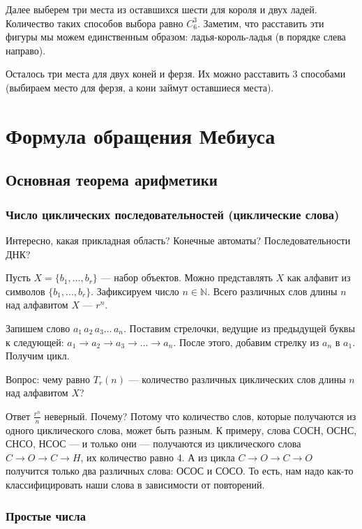 \documentclass[paper=a4, fontsize=11pt]{scrartcl}
\begin{document}
Далее выберем три места из оставшихся шести для короля и двух ладей. Количество таких способов выбора равно $C_6^3$. Заметим, что расставить эти фигуры мы можем единственным образом: ладья-король-ладья (в порядке слева направо).

Осталось три места для двух коней и ферзя. Их можно расставить 3 способами (выбираем место для ферзя, а кони займут оставшиеся места).

\section{Формула обращения Мебиуса}
\subsection{Основная теорема арифметики}
\subsubsection{Число циклических последовательностей (циклические слова)}

Интересно, какая прикладная область? Конечные автоматы? Последовательности ДНК?

Пусть $X= \{b_1,\dots,b_r\}$ --- набор объектов. Можно представлять $X$ как алфавит из символов $\{b_1,...,b_r\}$. Зафиксируем число $n\in \mathbb{N}$. Всего различных слов длины $n$ над алфавитом $X$ --- $r^n$.

Запишем слово $a_1 \, a_2 \, a_3 \ldots \, a_n$. Поставим стрелочки, ведущие из предыдущей буквы к следующей: $a_1 \to a_2 \to a_3 \to \ldots \to a_n$. После этого, добавим стрелку из $a_n$ в $a_1$. Получим цикл.

Вопрос: чему равно $T_r(n)$ --- количество различных циклических слов длины $n$ над алфавитом $X$?

Ответ $\frac{r^n}{n}$ неверный. Почему? Потому что количество слов, которые получаются из одного циклического слова, может быть разным. К примеру, слова СОСН, ОСНС, СНСО, НСОС --- и только они --- получаются из циклического слова $C \to O \to C \to H$, их количество равно 4. А из цикла $C \to O \to C \to O$ получится только два различных слова: ОСОС и СОСО. То есть, нам надо как-то классифицировать наши слова в зависимости от повторений.

\subsubsection{Простые числа}
\end{document}
